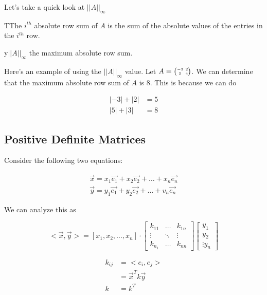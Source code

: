 	Let's take a quick look at $| | A | |_\infty$

	\begin{definition}
		TThe $i^{th}$ absolute row sum of $A$ is the sum of the absolute values of the entries in the $i^{th}$ row.
	\end{definition}

	\begin{theorem}
		y$| | A | |_\infty$ the maximum absolute row sum.
	\end{theorem}

	Here's an example of using the $| | A | |_\infty$ value. Let $A=\SmallMatrix{-3&2\\5&4}$. We can determine that the maximum absolute row sum of $A$ is 8. This is because we can do 

	\begin{align}
		|-3|+|2|&=5\\
		|5|+|3|&=\boxed{8}
	\end{align}
\subsection{Positive Definite Matrices}

	Consider the following two equations:

	\begin{align}
		\vec{x}=x_1\vec{e_1}+x_2\vec{e_2}+\ldots+x_n\vec{e_n}\\
		\vec{y}=y_1\vec{e_1}+y_2\vec{e_2}+\ldots+v_n\vec{e_n}
	\end{align}

	We can analyze this as 

	\begin{equation}
		<\vec{x},\vec{y}> = [x_1,x_2,\ldots,x_n]\cdot \begin{bmatrix} k_{11}&\ldots&k_{1n}\\ \vdots&\ddots&\vdots\\ k_{n_1}&\ldots&k_{nn} \end{bmatrix} \begin{bmatrix} y_1\\y_2\\ \vdots y_n \end{bmatrix} 
	\end{equation}

	\begin{align}
		k_{ij}&= <e_i,e_j>\\
		&=\vec{x}^Tk\vec{y}\\
		k&=k^T
	\end{align}

